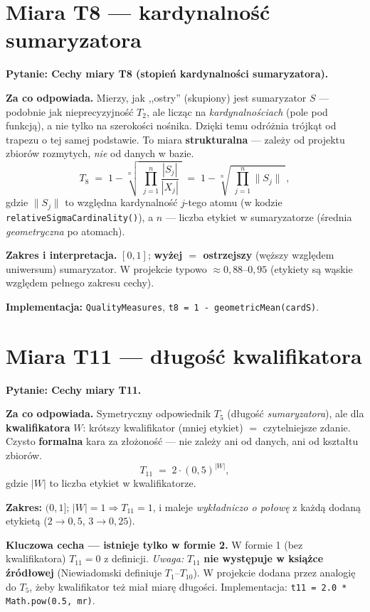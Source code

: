\documentclass[11pt]{article}
\newcommand{\code}[1]{\texttt{#1}}
\newcommand{\pyt}[1]{\medskip\noindent\textbf{\textcolor{mkbg}{Pytanie:} #1}\par\smallskip}
\begin{document}
\section{Miara T8 --- kardynalność sumaryzatora}

\pyt{Cechy miary T8 (stopień kardynalności sumaryzatora).}

\textbf{Za co odpowiada.} Mierzy, jak ,,ostry'' (skupiony) jest sumaryzator $S$ ---
podobnie jak nieprecyzyjność $T_2$, ale licząc na \emph{kardynalnościach} (pole pod
funkcją), a nie tylko na szerokości nośnika. Dzięki temu odróżnia trójkąt od trapezu o tej
samej podstawie. To miara \textbf{strukturalna} --- zależy od projektu zbiorów rozmytych,
\emph{nie} od danych w bazie.
\[
  T_8 \;=\; 1 - \sqrt[n]{\;\prod_{j=1}^{n} \frac{|S_j|}{|X_j|}\;}
       \;=\; 1 - \sqrt[n]{\;\prod_{j=1}^{n}\|S_j\|\;},
\]
gdzie $\|S_j\|$ to względna kardynalność $j$-tego atomu (w kodzie
\code{relativeSigmaCardinality()}), a $n$ --- liczba etykiet w sumaryzatorze
(średnia \emph{geometryczna} po atomach).

\textbf{Zakres i interpretacja.} $[0,1]$; \textbf{wyżej $=$ ostrzejszy} (węższy względem
uniwersum) sumaryzator. W projekcie typowo $\approx 0{,}88$--$0{,}95$ (etykiety są wąskie
względem pełnego zakresu cechy).

\textbf{Implementacja:} \code{QualityMeasures}, \code{t8 = 1 - geometricMean(cardS)}.

\section{Miara T11 --- długość kwalifikatora}

\pyt{Cechy miary T11.}

\textbf{Za co odpowiada.} Symetryczny odpowiednik $T_5$ (długość \emph{sumaryzatora}), ale
dla \textbf{kwalifikatora} $W$: krótszy kwalifikator (mniej etykiet) $=$ czytelniejsze
zdanie. Czysto \textbf{formalna} kara za złożoność --- nie zależy ani od danych, ani od
kształtu zbiorów.
\[
  T_{11} \;=\; 2\cdot(0{,}5)^{|W|},
\]
gdzie $|W|$ to liczba etykiet w kwalifikatorze.

\textbf{Zakres:} $(0,1]$; $|W|=1\Rightarrow T_{11}=1$, i maleje \emph{wykładniczo o połowę}
z każdą dodaną etykietą ($2\to0{,}5$, $3\to0{,}25$).

\textbf{Kluczowa cecha --- istnieje tylko w formie 2.} W formie 1 (bez kwalifikatora)
$T_{11}=0$ z definicji. \emph{Uwaga:} $T_{11}$ \textbf{nie występuje w książce źródłowej}
(Niewiadomski definiuje $T_1$--$T_{10}$). W projekcie dodana przez analogię do $T_5$, żeby
kwalifikator też miał miarę długości. Implementacja: \code{t11 = 2.0 * Math.pow(0.5, mr)}.
\end{document}

